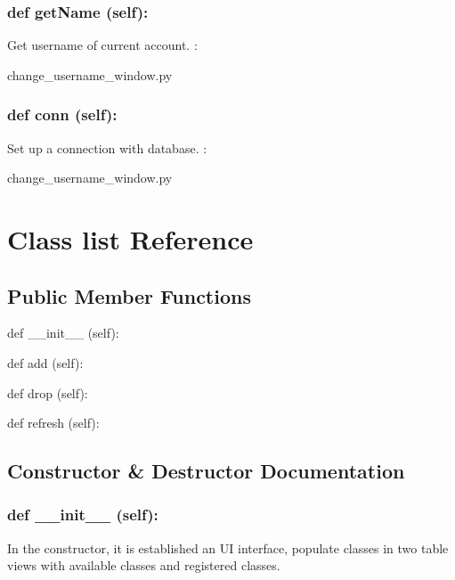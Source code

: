 \hypertarget{class_poly_a14a7ad77ce612b0c54f531d307ee4b39}{
\subsubsection[{def getName (self):}]{\setlength{\rightskip}{0pt plus 5cm}def {getName} (self):}}\label{class_poly_a14a7ad77ce612b0c54f531d307ee4b39}
Get username of current account.
:\begin{DoxyCompactItemize}
\item 
change\_username\_window.\-py\end{DoxyCompactItemize}


\hypertarget{class_poly_a14a7ad77ce612b0c54f531d307ee4b39}{
\subsubsection[{def conn (self):}]{\setlength{\rightskip}{0pt plus 5cm}def {conn} (self):}}\label{class_poly_a14a7ad77ce612b0c54f531d307ee4b39}
Set up a connection with database.
:\begin{DoxyCompactItemize}
\item 
change\_username\_window.\-py\end{DoxyCompactItemize}


\hypertarget{Class_list}{\section{Class list Reference}
\label{Class_list}
}
\subsection*{Public Member Functions}
\begin{DoxyCompactItemize}
\item 
def {\_\_init\_\_} (self):
\item 
def {add} (self):
\item 
def {drop} (self):
\item 
def {refresh} (self):
\end{DoxyCompactItemize}

\subsection{Constructor \& Destructor Documentation}
\hypertarget{class_poly_aa3def076b74bed67904976ad4f9fe9b1}{
\subsubsection[{def __init__ (self):}]{\setlength{\rightskip}{0pt plus 5cm}def {\_\_init\_\_} (self): 
}}
In the constructor, it is established an UI interface, populate classes in two table views with available classes and registered classes.
 

